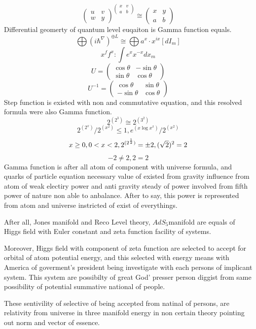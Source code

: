 \documentclass{jsarticle}
\begin{document}
  $$ \begin{pmatrix} u & v \\
  w & y \end{pmatrix}^{\begin{pmatrix} x & v \\
a & b \end{pmatrix}} \cong \begin{pmatrix} x & y \\
  a & b \end{pmatrix} $$
    Differential geomerty of quantum level euqaiton is Gamma function equals.
  $$ \bigoplus (i \hbar^{\nabla})^{\oplus L} \cong \bigoplus a^x\cdot x^{i x}
  [dI_m] $$
  $$ x^f f^x : \int e^x x^{-x}dx_m $$
  $$ U = \begin{pmatrix} \cos \theta & - \sin \theta \\
  \sin \theta & \cos \theta \end{pmatrix} $$
  $$ U^{-1} = \begin{pmatrix} \cos \theta &  \sin \theta \\
   - \sin \theta & \cos \theta \end{pmatrix} $$
      Step function is existed with non and commutative equation, and
   this resolved formula were also Gamma function.
   $$ 2^{(2^3)} \cong 2^{(3^2)} $$
   $$ 2^{(2^{x})} / 2^{(x^{2})} \le 1, {e^{{({x \log x}^x)}} / {2^{(x^{2})}}} $$
   $$ x \ge 0, 0 < x < 2, 2^{(2^{1 \over 2})} = \pm 2, (\sqrt{2})^2 = 2 $$
   $$ -2 \neq 2, 2 = 2  $$
      Gamma function is after all atom of component with universe formula,
   and quarks of particle equation necessary value of existed from
   gravity influence from atom of weak electiry power and anti gravity
   steady of power involved from fifth power of nature non able to anbalance.
   After to say, this power is represented from atom and universe instricted of
   exist of everythings.

   After all, Jones manifold and Reco Level theory, $AdS_5 $manifold are
   equals of Higgs field with Euler constant and zeta function facility
   of systems.

   Moreover, Higgs field with component of zeta function are selected to
   accept for orbital of atom potential energy, and this selected with
   energy means with America of goverment's president being investigate with
   each persons of implicant system.
   This system are possibilty of great God' presser person diggist from
   same possibility of potential summative national of people.

   These sentivility of selective of being accepted from natinal of persons,
   are relativity from universe in three manifold energy in non certain
   theory pointing out norm and vector of essence.
\end{document}
